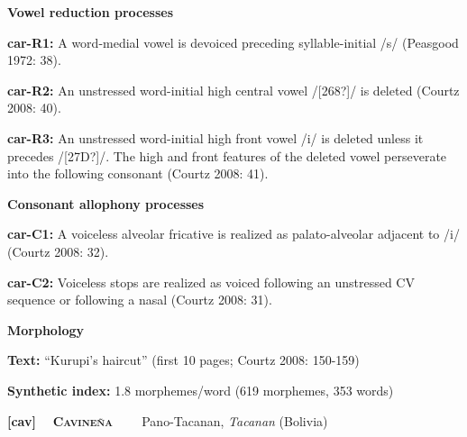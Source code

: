 \begin{styleBody}
\textbf{Vowel reduction processes}
\end{styleBody}

\begin{styleBody}
\textbf{car-R1:} A word-medial vowel is devoiced preceding syllable-initial /s/ (Peasgood 1972: 38).
\end{styleBody}

\begin{styleBody}
\textbf{car-R2:} An unstressed word-initial high central vowel /[268?]/ is deleted (Courtz 2008: 40).
\end{styleBody}

\begin{styleBody}
\textbf{car-R3:} An unstressed word-initial high front vowel /i/ is deleted unless it precedes /[27D?]/. The high and front features of the deleted vowel perseverate into the following consonant (Courtz 2008: 41).
\end{styleBody}

\begin{styleBody}
\textbf{Consonant allophony processes}
\end{styleBody}

\begin{styleBody}
\textbf{car-C1: }A voiceless alveolar fricative is realized as palato-alveolar adjacent to /i/ (Courtz 2008: 32).
\end{styleBody}

\begin{styleBody}
\textbf{car-C2: }Voiceless stops are realized as voiced following an unstressed CV sequence or following a nasal (Courtz 2008: 31).
\end{styleBody}

\begin{styleBody}
\textbf{Morphology}
\end{styleBody}

\begin{styleBody}
\textbf{Text: }“Kurupi’s haircut” (first 10 pages; Courtz 2008: 150-159)
\end{styleBody}

\begin{styleBody}
\textbf{Synthetic index: }1.8 morphemes/word (619 morphemes, 353 words)
\end{styleBody}

\clearpage\begin{styleBody}
\textbf{[cav] }\ \ \textbf{\textsc{Cavineña\ \ }}\textbf{\ \ }Pano-Tacanan, \textit{Tacanan} (Bolivia)
\end{styleBody}


